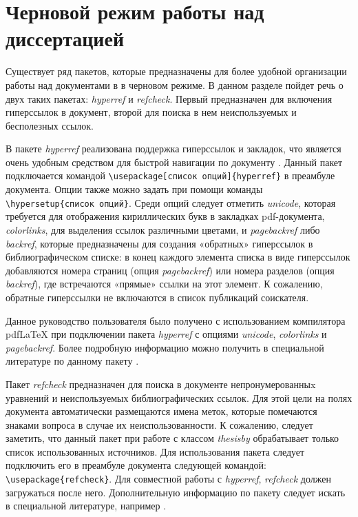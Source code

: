 \section{Черновой режим работы над диссертацией}
\label{chap:draft}

Существует ряд пакетов, которые предназначены для более удобной организации
работы над документами в \LaTeXe{} в черновом режиме. В данном разделе пойдет
речь о двух  таких пакетах: {\itshape hyperref} и {\itshape refcheck}. Первый
предназначен для включения гиперссылок в документ, второй для поиска в нем
неиспользуемых и бесполезных ссылок.

В пакете {\itshape hyperref} реализована поддержка гиперссылок и закладок, что является очень удобным средством для быстрой навигации по документу \cite{hyperref}. Данный пакет подключается командой \verb|\usepackage[список опций]{hyperref}| в преамбуле документа. Опции также можно задать при помощи команды \verb|\hypersetup{список опций}|. Среди опций следует отметить {\itshape unicode}, которая требуется для отображения кириллических букв в закладках pdf-документа, {\itshape colorlinks}, для выделения ссылок различными цветами, и {\itshape pagebackref} либо {\itshape  backref}, которые предназначены для создания «обратных» гиперссылок в библиографическом списке: в конец каждого элемента списка в виде гиперссылок добавляются номера страниц (опция {\itshape pagebackref}) или номера разделов (опция {\itshape backref}), где встречаются «прямые» ссылки на этот элемент. К сожалению, обратные гиперссылки не включаются в список публикаций соискателя.

Данное руководство пользователя было получено с использованием 
компилятора pdf\LaTeX{} при подключении пакета {\itshape hyperref} с опциями {\itshape unicode},  {\itshape colorlinks} и {\itshape pagebackref}. Более подробную информацию можно получить в специальной литературе по данному пакету \cite{hyperref,hyperrefop}.

Пакет {\itshape refcheck} предназначен для поиска в документе непронумерованныx уравнений и неиспользуемых библиографических ссылок. Для этой цели на полях документа автоматически размещаются имена меток, которые помечаются знаками вопроса в случае их неиспользованности. К сожалению, следует заметить, что данный пакет при работе с классом {\itshape thesisby} обрабатывает только список использованных источников. Для использования пакета следует подключить его в преамбуле документа следующей командой: \verb|\usepackage{refcheck}|. Для совместной работы с {\itshape hyperref}, {\itshape refcheck} должен загружаться после него. Дополнительную информацию по пакету следует искать в специальной литературе, например \cite{refcheck}.


